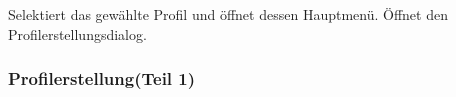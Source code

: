 \begin{center}
\setlength\fboxsep{20pt}
\setlength\fboxrule{1pt}
\end{center}

\begin{requirements}
 Selektiert das gewählte Profil und öffnet dessen Hauptmenü.
 Öffnet den Profilerstellungsdialog.
\end{requirements}

\subsubsection{Profilerstellung(Teil 1)}

\begin{center}
\setlength\fboxsep{20pt}
\setlength\fboxrule{1pt}
\end{center}

